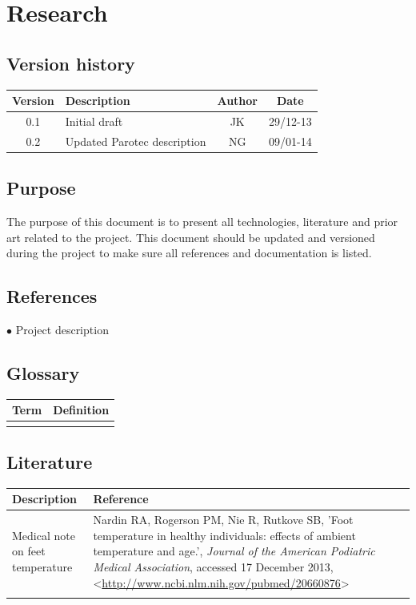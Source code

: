 \chapter{Research}
\section{Version history}
\begin{table}[H]
\begin{tabular}{|c|p{9cm}|c|c|}
\hline
Version & Description & Author & Date\\
\hline
0.1 & Initial draft & JK & 29/12-13\\
\hline
0.2 & Updated Parotec description & NG & 09/01-14\\
\hline
\end{tabular}
\end{table}

\section{Purpose}
The purpose of this document is to present all technologies, literature and prior art related to the project. This document should be updated and versioned during the project to make sure all references and documentation is listed.

\section{References}
$\bullet$ Project description

\section{Glossary}
\begin{table}[H]
\centering
\begin{tabular}{|p{4cm}|p{7cm}|}
\hline
Term & Definition\\ \hline
&\\ \hline
\end{tabular}
\end{table}

\section{Literature}


\begin{table}[H]
\centering
\begin{tabular}{|p{4cm}|p{10cm}|}
\hline
Description & Reference\\ \hline
Medical note on feet temperature&Nardin RA, Rogerson PM, Nie R, Rutkove SB, 'Foot temperature in healthy individuals: effects of ambient temperature and age.', \textit{Journal of the American Podiatric Medical Association}, accessed 17 December 2013, <\url{http://www.ncbi.nlm.nih.gov/pubmed/20660876}>\\ \hline
& \\ \hline
\end{tabular}
\end{table}

